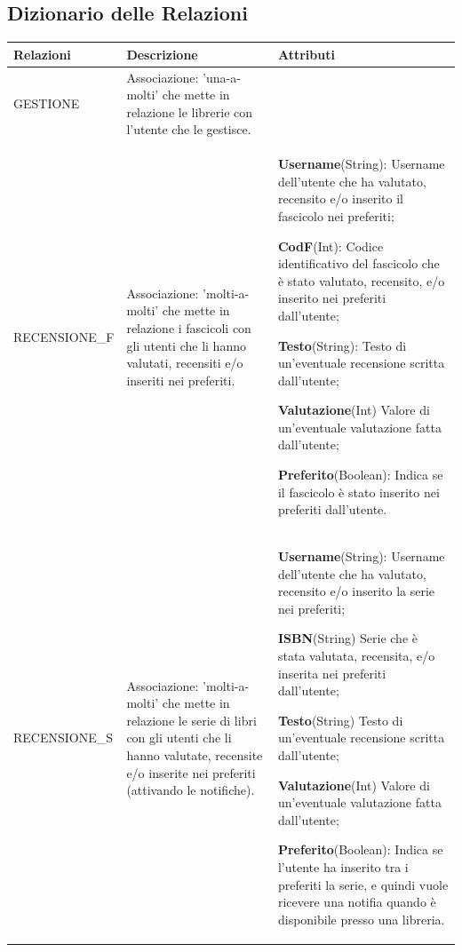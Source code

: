 \documentclass{article}
\begin{document}
\newpage
\subsection{Dizionario delle Relazioni}
\begin{table}[h]
\centering
\begin{tabular}{|p{3cm}|p{5cm}|p{6cm}|}
    \hline
    \textbf{Relazioni} & \textbf{Descrizione} & \textbf{Attributi} \\\hline

    GESTIONE & Associazione: 'una-a-molti' che mette in relazione le librerie con l'utente che le gestisce. & \\\hline

    RECENSIONE\_F & Associazione: 'molti-a-molti' che mette in relazione i fascicoli con gli utenti che li hanno valutati, recensiti e/o inseriti nei preferiti. & \textbf{Username}(String): Username dell'utente che ha valutato, recensito e/o inserito il fascicolo nei preferiti; \par
    \textbf{CodF}(Int): Codice identificativo del fascicolo che è stato valutato, recensito, e/o inserito nei preferiti dall'utente; \par
    \textbf{Testo}(String): Testo di un'eventuale recensione scritta dall'utente; \par
    \textbf{Valutazione}(Int) Valore di un'eventuale valutazione fatta dall'utente; \par
    \textbf{Preferito}(Boolean): Indica se il fascicolo è stato inserito nei preferiti dall'utente.\\\hline

    RECENSIONE\_S & Associazione: 'molti-a-molti' che mette in relazione le serie di libri con gli utenti che li hanno valutate, recensite e/o inserite nei preferiti (attivando le notifiche). & \textbf{Username}(String): Username dell'utente che ha valutato, recensito e/o inserito la serie nei preferiti; \par
    \textbf{ISBN}(String) Serie che è stata valutata, recensita, e/o inserita nei preferiti dall'utente; \par
    \textbf{Testo}(String) Testo di un'eventuale recensione scritta dall'utente; \par
    \textbf{Valutazione}(Int) Valore di un'eventuale valutazione fatta dall'utente; \par
    \textbf{Preferito}(Boolean): Indica se l'utente ha inserito tra i preferiti la serie, e quindi vuole ricevere una notifia quando è disponibile presso una libreria.\\\hline 
\end{tabular}
\end{table}
\end{document}
